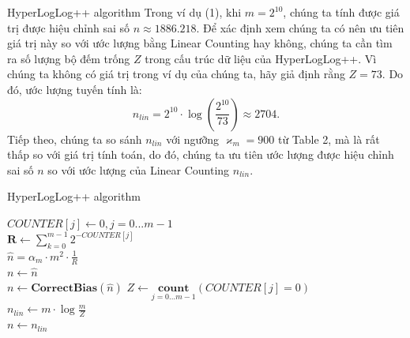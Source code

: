 \documentclass[10pt]{beamer}
\begin{document}
\begin{frame}{HyperLogLog++ algorithm}
  Trong ví dụ (1), khi $m = 2^{10}$, chúng ta tính được giá trị được hiệu chỉnh sai số $n \approx 1886.218$. Để xác định xem chúng ta có nên 
  ưu tiên giá trị này so với ước lượng bằng Linear Counting hay không, chúng ta cần tìm ra số lượng bộ đếm trống $Z$ trong cấu trúc dữ liệu của 
  HyperLogLog++. Vì chúng ta không có giá trị trong ví dụ của chúng ta, hãy giả định rằng $Z = 73$.
  Do đó, ước lượng tuyến tính là:
  \[n_{lin} = 2^{10} \cdot \log\left(\frac{2^{10}}{73}\right) \approx 2704.\]
  Tiếp theo, chúng ta so sánh $n_{lin}$ với ngưỡng $\varkappa_m = 900$ từ Table 2, mà là rất thấp so với giá trị tính toán, do đó, 
  chúng ta ưu tiên ước lượng được hiệu chỉnh sai số $n$ so với ước lượng của Linear Counting $n_{lin}$.
\end{frame}

\begin{frame}{HyperLogLog++ algorithm}
  \begin{algorithm}[H]
    \vspace{0.25cm}
    \DontPrintSemicolon
    \LinesNumberedHidden
    \caption[]{Estimating cardinality with \textit{HyperLogLog++}}
    $COUNTER[j] \gets 0, j = 0 ... m-1$\\
    $\textbf{R} \gets \sum\limits_{k=0}^{m-1}2^{-COUNTER[j]}$\\
    $\hat{n} = \alpha_m \cdot m^2 \cdot \frac{1}{R}$\\
    $n \gets \hat{n}$\\
    {
        $n \gets \textbf{CorrectBias}(\hat{n})$
    }
    $Z \gets \underset{j=0...m-1}{\textbf{count}}(COUNTER[j] = 0)$\\
    {
        $n_{lin} \gets m \cdot \log\frac{m}{Z}$\\
        {
            $n \gets n_{lin}$
        }
    }
    \vspace{0.25cm}
\end{algorithm}
\end{frame}
\end{document}
